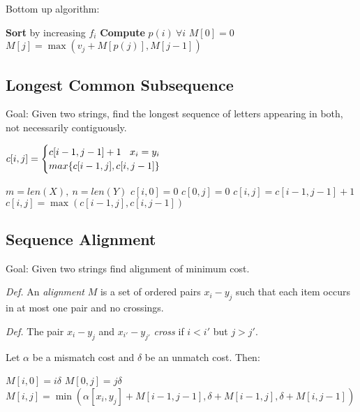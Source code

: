 Bottom up algorithm:
\begin{algorithm}[H]
\begin{algorithmic}[1]
\State \textbf{Sort} by increasing $f_i$
\State \textbf{Compute} $p(i)\ \forall i$ 
\State $M[0] = 0$
\State $M[j] = \max(v_j + M[p(j)], M[j-1])$
\EndFor
\EndProcedure
\end{algorithmic}
\end{algorithm}

\subsection*{Longest Common Subsequence}
Goal: Given two strings, find the longest sequence of letters appearing in both, not necessarily contiguously. 

$c[i,j] = \begin{cases}
 c[i-1,j-1] + 1 \hfill x_i = y_i \\
 max \{ c[i-1,j],c[i,j-1]\}	
 \end{cases}$
 
\begin{algorithm}[H]
\begin{algorithmic}[1]
\State $m = len(X),\ n = len(Y)$
 $c[i,0] = 0$
\EndFor
{} $c[0,j] = 0$
\EndFor
{}
\State $c[i,j] = c[i-1,j-1] + 1$
\Else $c[i,j] = \max (c[i-1,j],c[i,j-1])$
\EndIf
\EndFor
\EndFor
\State {}
\EndProcedure
\end{algorithmic}
\end{algorithm}

\subsection*{Sequence Alignment}
Goal: Given two strings find alignment of minimum cost. 

\textit{Def.} An \textit{alignment} $M$ is a set of ordered pairs $x_i-y_j$ such that each item occurs in at most one pair and no crossings. 

\textit{Def.} The pair $x_i-y_j$ and $x_{i'}-y_{j'}$ \textit{cross} if $i < i'$ but $j > j'$. 

Let $\alpha$ be a mismatch cost and $\delta$ be an unmatch cost.
Then:

\begin{algorithm}[H]
\begin{algorithmic}[1]
 $M[i,0] = i\delta$
\EndFor
{} $M[0,j] = j\delta$
\EndFor
{}
\State $M[i,j] = \min(\alpha[x_i,y_j] + M[i-1,j-1], \delta +M[i-1,j], \delta + M[i,j-1])$
\EndFor
\EndFor
\State {}
\EndProcedure
\end{algorithmic}
\end{algorithm}

